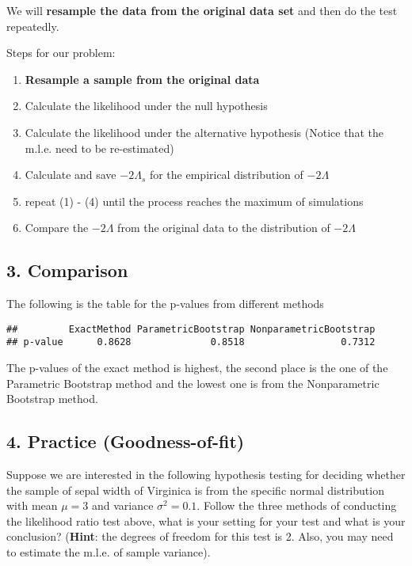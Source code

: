 \documentclass[12pt]{article}
\begin{document}
We will \textbf{resample the data from the original data set} and then
do the test repeatedly.

Steps for our problem:

\begin{enumerate}
\def\labelenumi{\roman{enumi}.}
\item
  \textbf{Resample a sample from the original data}
\item
  Calculate the likelihood under the null hypothesis
\item
  Calculate the likelihood under the alternative hypothesis (Notice that
  the m.l.e. need to be re-estimated)
\item
  Calculate and save \(-2\Lambda_s\) for the empirical distribution of
  \(-2\Lambda\)
\item
  repeat (1) - (4) until the process reaches the maximum of simulations
\item
  Compare the \(-2\Lambda\) from the original data to the distribution
  of \(-2\Lambda\)
\end{enumerate}

\hypertarget{comparison}{%
\subsection{3. Comparison}\label{comparison}}

The following is the table for the p-values from different methods

\begin{verbatim}
##         ExactMethod ParametricBootstrap NonparametricBootstrap
## p-value      0.8628              0.8518                 0.7312
\end{verbatim}

The p-values of the exact method is highest, the second place is the one
of the Parametric Bootstrap method and the lowest one is from the
Nonparametric Bootstrap method.

\hypertarget{practice-goodness-of-fit}{%
\subsection{4. Practice
(Goodness-of-fit)}\label{practice-goodness-of-fit}}

Suppose we are interested in the following hypothesis testing for
deciding whether the sample of sepal width of Virginica is from the
specific normal distribution with mean \(\mu=3\) and variance
\(\sigma^2 = 0.1\). Follow the three methods of conducting the
likelihood ratio test above, what is your setting for your test and what
is your conclusion? (\textbf{Hint}: the degrees of freedom for this test
is 2. Also, you may need to estimate the m.l.e. of sample variance).



\end{document}
